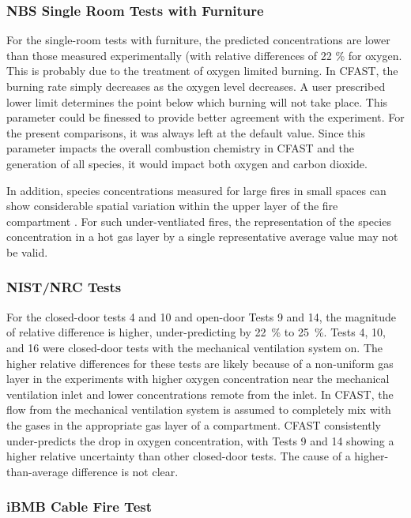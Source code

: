 \subsubsection{NBS Single Room Tests with Furniture}

For the single-room tests with furniture, the predicted concentrations are lower than those 
measured experimentally (with relative differences of 22 \% for oxygen.  This is probably due to the treatment of oxygen limited burning.  In CFAST, the burning rate simply decreases as the oxygen level decreases.  A user prescribed lower limit determines the point below which burning will not take place.  This parameter could be finessed to provide better agreement with the experiment.  For the present comparisons, it was always left at the default value. Since this parameter impacts the overall combustion chemistry in CFAST and the generation of all species, it would impact both oxygen and carbon dioxide.

In addition, species concentrations measured for large fires in small spaces can show considerable spatial variation within the upper layer of the fire compartment \cite{Bundy:2007}. For such under-ventliated fires, the representation of the species concentration in a hot gas layer by a single representative average value may not be valid.

\subsubsection{NIST/NRC Tests}

For the closed-door tests 4 and 10 and open-door Tests 9 and 14, the magnitude of relative difference is higher, under-predicting by 22~\% to 25~\%.  Tests 4, 10, and 16 were closed-door tests with the mechanical ventilation system on.  The higher relative differences for these tests are likely because of a non-uniform gas layer in the experiments with higher oxygen concentration near the mechanical ventilation inlet and lower concentrations remote from the inlet.  In CFAST, the flow from the mechanical ventilation system is assumed to completely mix with the gases in the appropriate gas layer of a compartment.  CFAST consistently under-predicts the drop in oxygen concentration, with Tests 9 and 14 showing a higher relative uncertainty than other closed-door tests.  The cause of a higher-than-average difference is not clear.

\subsubsection{iBMB Cable Fire Test}

